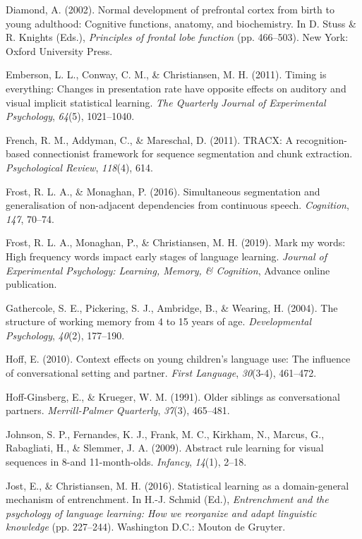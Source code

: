 \documentclass[man,mask,floatsintext]{apa6}
\begin{document}
\hypertarget{ref-diamond2002normal}{}
Diamond, A. (2002). Normal development of prefrontal cortex from birth
to young adulthood: Cognitive functions, anatomy, and biochemistry. In
D. Stuss \& R. Knights (Eds.), \emph{Principles of frontal lobe
function} (pp. 466--503). New York: Oxford University Press.

\hypertarget{ref-emberson2011timing}{}
Emberson, L. L., Conway, C. M., \& Christiansen, M. H. (2011). Timing is
everything: Changes in presentation rate have opposite effects on
auditory and visual implicit statistical learning. \emph{The Quarterly
Journal of Experimental Psychology}, \emph{64}(5), 1021--1040.

\hypertarget{ref-french2011tracx}{}
French, R. M., Addyman, C., \& Mareschal, D. (2011). TRACX: A
recognition-based connectionist framework for sequence segmentation and
chunk extraction. \emph{Psychological Review}, \emph{118}(4), 614.

\hypertarget{ref-frost2016simultaneous}{}
Frost, R. L. A., \& Monaghan, P. (2016). Simultaneous segmentation and
generalisation of non-adjacent dependencies from continuous speech.
\emph{Cognition}, \emph{147}, 70--74.

\hypertarget{ref-frost2019}{}
Frost, R. L. A., Monaghan, P., \& Christiansen, M. H. (2019). Mark my
words: High frequency words impact early stages of language learning.
\emph{Journal of Experimental Psychology: Learning, Memory, \&
Cognition}, Advance online publication.

\hypertarget{ref-gathercole2004structure}{}
Gathercole, S. E., Pickering, S. J., Ambridge, B., \& Wearing, H.
(2004). The structure of working memory from 4 to 15 years of age.
\emph{Developmental Psychology}, \emph{40}(2), 177--190.

\hypertarget{ref-hoff2010context}{}
Hoff, E. (2010). Context effects on young children's language use: The
influence of conversational setting and partner. \emph{First Language},
\emph{30}(3-4), 461--472.

\hypertarget{ref-hoff1991older}{}
Hoff-Ginsberg, E., \& Krueger, W. M. (1991). Older siblings as
conversational partners. \emph{Merrill-Palmer Quarterly}, \emph{37}(3),
465--481.

\hypertarget{ref-johnson2009abstract}{}
Johnson, S. P., Fernandes, K. J., Frank, M. C., Kirkham, N., Marcus, G.,
Rabagliati, H., \& Slemmer, J. A. (2009). Abstract rule learning for
visual sequences in 8-and 11-month-olds. \emph{Infancy}, \emph{14}(1),
2--18.

\hypertarget{ref-jost201610}{}
Jost, E., \& Christiansen, M. H. (2016). Statistical learning as a
domain-general mechanism of entrenchment. In H.-J. Schmid (Ed.),
\emph{Entrenchment and the psychology of language learning: How we
reorganize and adapt linguistic knowledge} (pp. 227--244). Washington
D.C.: Mouton de Gruyter.
\end{document}
